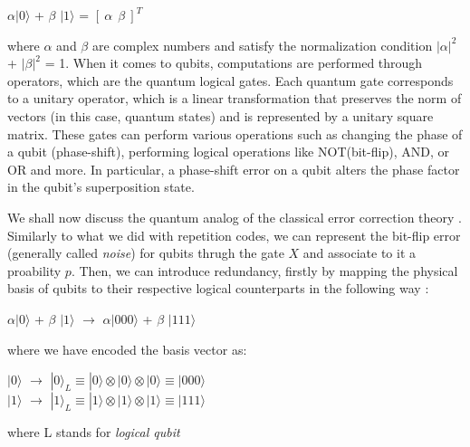 \documentclass{Configuration_Files/PoliMi3i_thesis}
\begin{document}
\begin{center}
	$\alpha |0 \rangle$ + $\beta$ $|1 \rangle$ =  $[ \ \alpha \ \ \beta \ ]^T $
\end{center}

where $\alpha$ and $\beta$ are complex numbers and satisfy the normalization condition $|\alpha|^2$ + $|\beta|^2$ = 1. \newline
When it comes to qubits, computations are performed through operators, which are the quantum logical gates. Each quantum gate corresponds to a unitary operator, which is a linear transformation that preserves the norm of vectors (in this case, quantum states) and is represented by a unitary square matrix. These gates can perform various operations such as changing the phase of a qubit (phase-shift), performing logical operations like NOT(bit-flip), AND, or OR and more. In particular, a phase-shift error on a qubit alters the phase factor in the qubit's superposition state. \newline

We shall now discuss the quantum analog of the classical error correction theory \cite{Cha06}. \newline
Similarly to what we did with repetition codes, we can represent the bit-flip error (generally called {\it noise}) for qubits thrugh the gate $X$ and associate to it a proability $p$. \newline
Then, we can introduce redundancy, firstly by mapping the physical basis of qubits to their respective logical counterparts in the following way \cite{Nie06}:

\begin{center}
	$\alpha |0 \rangle$ + $\beta$ $|1 \rangle$ $\rightarrow$ $\alpha |000 \rangle$ + $\beta$ $|111 \rangle$
\end{center}

where we have encoded the basis vector as:

\begin{center}
	$|0 \rangle$ $\rightarrow$ $|0 \rangle_L \equiv |0\rangle \otimes |0\rangle \otimes |0\rangle \equiv |000\rangle$   \\
	$|1 \rangle$ $\rightarrow$ $|1 \rangle_L \equiv |1\rangle \otimes |1\rangle \otimes |1\rangle \equiv |111\rangle$
\end{center}

where L stands for {\it logical qubit} 
\end{document}
